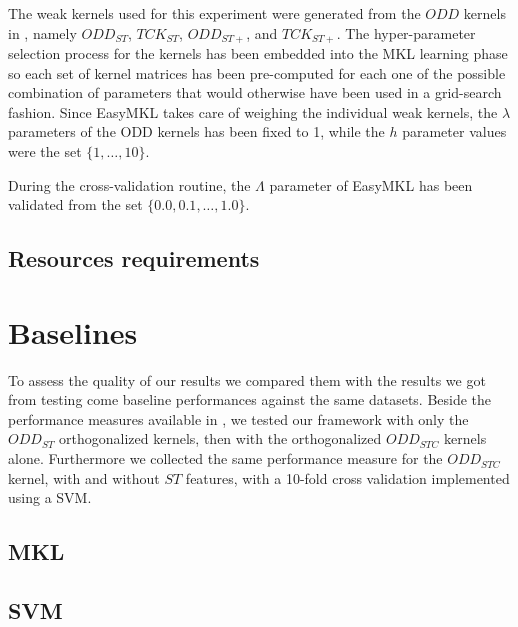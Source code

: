 The weak kernels used for this experiment were generated from the $ODD$ kernels
in \cite{rtesselli}, namely $ODD_{ST}$, $TCK_{ST}$, $ODD_{ST+}$, and $TCK_{ST+}$.
The hyper-parameter selection process for the kernels has been embedded
into the MKL learning phase so each set of kernel matrices has been
pre-computed for each one of the possible combination of parameters that would
otherwise have been used in a grid-search fashion.
Since EasyMKL takes care of weighing the individual weak kernels, the $\lambda$
parameters of the ODD kernels has been fixed to 1, while the $h$ parameter
values were the set $\{1,\dots,10\}$.

During the cross-validation routine, the $\Lambda$ parameter of EasyMKL has been
validated from the set $\{0.0, 0.1,\dots,1.0\}$.

\subsection{Resources requirements}


\section{Baselines}
To assess the quality of our results we compared them with the results we got
from testing come baseline performances against the same datasets.
Beside the performance measures available in \cite{gmkl}, we tested our framework
with only the $ODD_{ST}$ orthogonalized kernels, then with the orthogonalized
$ODD_{STC}$ kernels alone.
Furthermore we collected the same performance measure for the $ODD_{STC}$ kernel,
with and without $ST$ features, with a 10-fold cross validation implemented
using a SVM.

\subsection{MKL}

\subsection{SVM}

